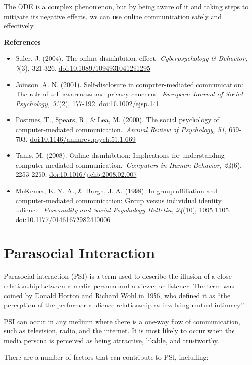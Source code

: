 \documentclass[
  b5paper]{book}
\begin{document}
The ODE is a complex phenomenon, but by being aware of it and taking steps to mitigate its negative effects, we can use online communication safely and effectively.

\textbf{References}

\begin{itemize}
\item
  Suler, J. (2004). The online disinhibition effect.~\emph{Cyberpsychology \& Behavior, 7}(3), 321-326. \url{doi:10.1089/1094931041291295}
\item
  Joinson, A. N. (2001). Self-disclosure in computer-mediated communication: The role of self-awareness and privacy concerns.~\emph{European Journal of Social Psychology, 31}(2), 177-192. \url{doi:10.1002/ejsp.141}
\item
  Postmes, T., Spears, R., \& Lea, M. (2000). The social psychology of computer-mediated communication.~\emph{Annual Review of Psychology, 51}, 669-703. \url{doi:10.1146/annurev.psych.51.1.669}
\item
  Tanis, M. (2008). Online disinhibition: Implications for understanding computer-mediated communication.~\emph{Computers in Human Behavior, 24}(6), 2253-2260. \url{doi:10.1016/j.chb.2008.02.007}
\item
  McKenna, K. Y. A., \& Bargh, J. A. (1998). In-group affiliation and computer-mediated communication: Group versus individual identity salience.~\emph{Personality and Social Psychology Bulletin, 24}(10), 1095-1105. \url{doi:10.1177/01461672982410006}
\end{itemize}

\hypertarget{parasocial-interaction}{%
\section{Parasocial Interaction}\label{parasocial-interaction}}

Parasocial interaction (PSI) is a term used to describe the illusion of a close relationship between a media persona and a viewer or listener. The term was coined by Donald Horton and Richard Wohl in 1956, who defined it as ``the perception of the performer-audience relationship as involving mutual intimacy.''

PSI can occur in any medium where there is a one-way flow of communication, such as television, radio, and the internet. It is most likely to occur when the media persona is perceived as being attractive, likable, and trustworthy.

There are a number of factors that can contribute to PSI, including:
\end{document}
